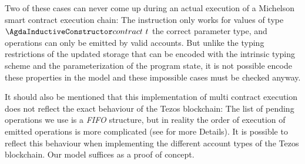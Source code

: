   Two of these cases can never come up during an actual execution of
  a Michelson smart contract execution chain:
  The  instruction only works for values of type $\Acontract~t$ the correct parameter type, and operations can only be emitted by valid accounts.
		But unlike the typing restrictions of the updated storage that can be encoded
		with the intrinsic typing scheme and the parameterization of the program state,
		it is not possible encode these properties
		in the model and these impossible cases must be checked anyway.

		It should also be mentioned that this implementation of multi contract execution
		does not reflect the exact behaviour of the Tezos blockchain:
		The list of pending operations we use is a \emph{FIFO} structure,
		but in reality the order of execution of emitted operations is more complicated
		(see \cite{devres} for more Details).
		It is possible to reflect this behaviour when implementing
		the different account types of the Tezos blockchain.
		Our model suffices as a proof of concept.



